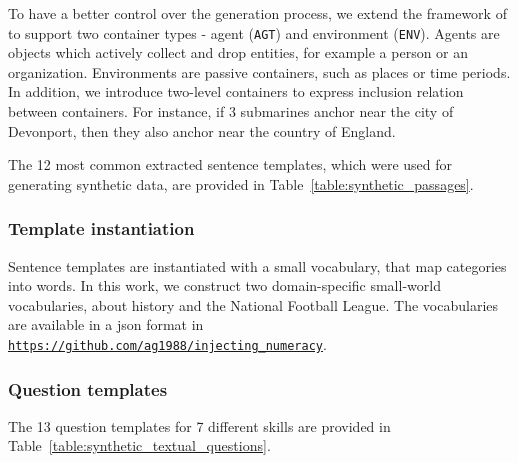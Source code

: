 \documentclass[11pt,a4paper]{article}
\begin{document}
To have a better control over the generation process, we extend the framework of \citet{hosseini2014learning} to support two container types - agent (\texttt{AGT}) and environment (\texttt{ENV}). Agents are objects which actively collect and drop entities, for example a person or an organization. Environments are passive containers, such as places or time periods. In addition, we introduce two-level containers to express inclusion relation between containers. For instance, if 3 submarines anchor near the city of Devonport, then they also anchor near the country of England.

The 12 most common extracted sentence templates, which were used for generating synthetic data, are provided in Table~\ref{table:synthetic_passages}.


\subsubsection{Template instantiation}
Sentence templates are instantiated with a small vocabulary, that map categories into words.
In this work, we construct two domain-specific small-world vocabularies, about history and the National Football League. 
The vocabularies are available in a json format in \texttt{\url{https://github.com/ag1988/injecting_numeracy}}.


\subsubsection{Question templates}
The 13 question templates for 7 different skills are provided in Table~\ref{table:synthetic_textual_questions}.
\end{document}

